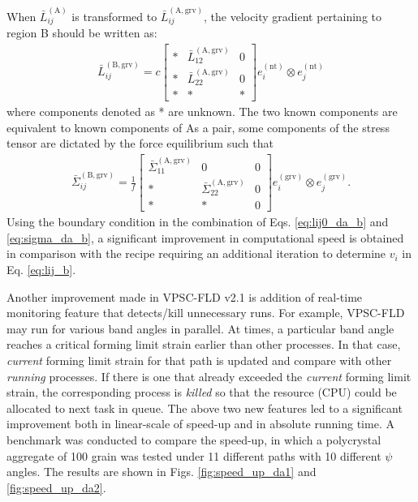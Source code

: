 \documentclass[12pt]{amsart}
\begin{document}
When $\bar{L}^\mathrm{(A)}_{ij}$ is transformed to $\bar{L}^\mathrm{(A,grv)}_{ij}$, the velocity gradient pertaining to region B should be written as:
\begin{eqnarray}
  \label{eq:lij0_da_b}
  \bar{L}^{\mathrm{(B,grv)}}_{ij}= c
  \begin{bmatrix}
    * & \bar{L}^\mathrm{(A,grv)}_{12}  & 0 \\
    * & \bar{L}^\mathrm{(A,grv)}_{22}  & 0 \\
    * & *    & *
  \end{bmatrix}
  e^\mathrm{(nt)}_i \otimes e^\mathrm{(nt)}_j
\end{eqnarray}
where components denoted as * are unknown.
The two known components are equivalent to known components of
As a pair, some components of the stress tensor are dictated by the force equilibrium such that
\begin{eqnarray}
  \label{eq:sigma_da_b}
  \bar{\Sigma}^{\mathrm{(B,grv)}}_{ij}= \frac{1}{f}
  \begin{bmatrix}
    \bar{\Sigma}^\mathrm{(A,grv)}_{11}  & 0                                  & 0 \\
    *                                  & \bar{\Sigma}^\mathrm{(A,grv)}_{22}  & 0 \\
    *                                  & *                                  & 0
  \end{bmatrix}
  e^\mathrm{(grv)}_i \otimes e^\mathrm{(grv)}_j.
\end{eqnarray}
Using the boundary condition in the combination of Eqs. \ref{eq:lij0_da_b} and \ref{eq:sigma_da_b}, a significant improvement in computational speed is obtained
in comparison with the recipe requiring an additional iteration to determine $v_i$ in Eq. \ref{eq:lij_b}.




Another improvement made in VPSC-FLD v2.1 is addition of real-time monitoring feature that detects/kill unnecessary runs.
For example, VPSC-FLD may run for various band angles in parallel.
At times, a particular band angle reaches a critical forming limit strain earlier than other processes.
In that case, \emph{current} forming limit strain for that path is updated and compare with other \emph{running} processes.
If there is one that already exceeded the \emph{current} forming limit strain, the corresponding process is \emph{killed} so that the resource (CPU) could be allocated to next task in queue.
\newline
The above two new features led to a significant improvement both in linear-scale of speed-up and in absolute running time.
A benchmark was conducted to compare the speed-up, in which a polycrystal aggregate of 100 grain was tested under  11 different paths with 10 different $\psi$ angles.
The results are shown in Figs. \ref{fig:speed_up_da1} and \ref{fig:speed_up_da2}.
\end{document}
